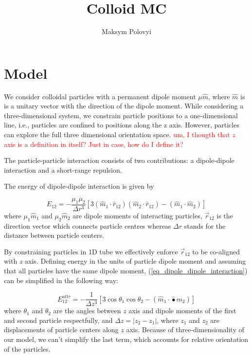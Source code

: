 \documentclass[12pt,a4paper]{article}
\author{Maksym Polovyi}
\title{Colloid MC}
\begin{document}
\section{Model}

We consider colloidal particles with a permanent dipole moment $\mu \hat{m}$, where $\hat{m}$ is is a unitary vector with the direction of the dipole moment. While considering a three-dimensional system, we constrain particle positions to a one-dimensional line, i.e., particles are confined to positions along the z axis. However, particles can explore the full three dimensional orientation space. \textcolor{red}{um, I thougth that $z$ axis is a definition in itself? Just in case, how do I define it?}

The particle-particle interaction consists of two contributions: a dipole-dipole interaction and a short-range repulsion.

The energy of dipole-dipole interaction is given by

\label{eq_dipole_dipole_interaction}
\begin{equation}
E_{12} = - \frac{\mu_1 \mu_2}{\Delta r^3}[3 (\hat{m}_1 \cdot \hat{r}_{12})(\hat{m}_2 \cdot \hat{r}_{12}) - (\hat{m}_1 \cdot \hat{m}_2)]
\end{equation}
where $\mu_1 \hat{m}_1$ and $\mu_2 \hat{m}_2$ are dipole moments of interacting particles, $\vec{r}_{12}$ is the direction vector which connects particle centres whereas $\Delta r$ stands for the distance between particle centers.

By constraining particles in 1D tube we effectively enforce $\vec{r}_{12}$ to be co-aligned with $z$ axis. Defining energy in the units of particle dipole moment and assuming that all particles have the same dipole moment, (\ref{eq_dipole_dipole_interaction}) can be simplified in the following way:

\label{eq_dipole_dipole_1D}
\begin{equation}
E_{12}^{attr} = - \frac{1}{\Delta z^3} [3 \cos \theta_1 \cos \theta_2 - (\hat{m}_1 \cdot \hat{•}{m}_2)]
\end{equation}
where $\theta_1$ and $\theta_2$ are the angles between $z$ axis and dipole moments of the first and second particle respectfully, and $\Delta z = |z_2 - z_1|$, where $z_1$ and $z_2$ are displacements of particle centers along $z$ axis. Because of three-dimensionality of our model, we can't simplify the last term, which accounts for relative orientation of the particles.
\end{document}
